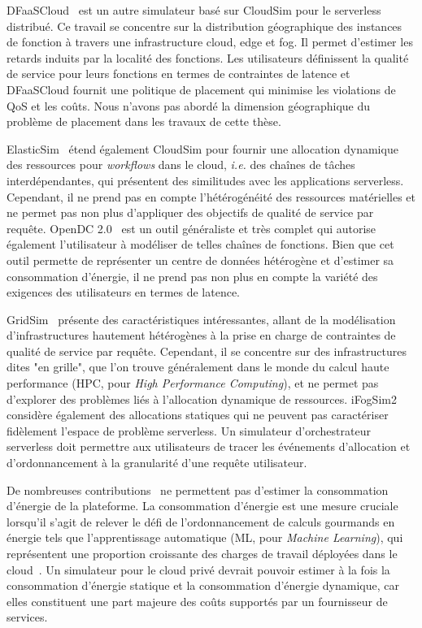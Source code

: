 DFaaSCloud~\cite{jeonCloudSimExtensionSimulatingDistributed2019} est un autre simulateur basé sur CloudSim pour le serverless distribué. Ce travail se concentre sur la distribution géographique des instances de fonction à travers une infrastructure cloud, edge et fog. Il permet d'estimer les retards induits par la localité des fonctions. Les utilisateurs définissent la qualité de service pour leurs fonctions en termes de contraintes de latence et DFaaSCloud fournit une politique de placement qui minimise les violations de \gls{QoS} et les coûts. Nous n'avons pas abordé la dimension géographique du problème de placement dans les travaux de cette thèse.

ElasticSim~\cite{cai_elasticsim_2017} étend également CloudSim pour fournir une allocation dynamique des ressources pour \textit{workflows} dans le cloud, \textit{i.e.} des chaînes de tâches interdépendantes, qui présentent des similitudes avec les applications serverless. Cependant, il ne prend pas en compte l'hétérogénéité des ressources matérielles et ne permet pas non plus d'appliquer des objectifs de qualité de service par requête. OpenDC 2.0~\cite{mastenbroekOpenDCConvenientModeling2021} est un outil généraliste et très complet qui autorise également l'utilisateur à modéliser de telles chaînes de fonctions. Bien que cet outil permette de représenter un centre de données hétérogène et d'estimer sa consommation d'énergie, il ne prend pas non plus en compte la variété des exigences des utilisateurs en termes de latence.

GridSim~\cite{buyyaGridSimToolkitModeling2002} présente des caractéristiques intéressantes, allant de la modélisation d'infrastructures hautement hétérogènes à la prise en charge de contraintes de qualité de service par requête. Cependant, il se concentre sur des infrastructures dites "en grille", que l'on trouve généralement dans le monde du calcul haute performance (\gls{HPC}, pour \textit{High Performance Computing}), et ne permet pas d'explorer des problèmes liés à l'allocation dynamique de ressources. iFogSim2~\cite{mahmudIFogSim2ExtendedIFogSim2021} considère également des allocations statiques qui ne peuvent pas caractériser fidèlement l'espace de problème serverless.
Un simulateur d'orchestrateur serverless doit permettre aux utilisateurs de tracer les événements d'allocation et d'ordonnancement à la granularité d'une requête utilisateur.

De nombreuses contributions~\cite{jeonCloudSimExtensionSimulatingDistributed2019, cai_elasticsim_2017, buyyaGridSimToolkitModeling2002, nunez_icancloud_2012} ne permettent pas d'estimer la consommation d'énergie de la plateforme. La consommation d'énergie est une mesure cruciale lorsqu'il s'agit de relever le défi de l'ordonnancement de calculs gourmands en énergie tels que l'apprentissage automatique (\gls{ML}, pour \textit{Machine Learning}), qui représentent une proportion croissante des charges de travail déployées dans le cloud~\cite{masanetRecalibratingGlobalData2020}.
Un simulateur pour le cloud privé devrait pouvoir estimer à la fois la consommation d'énergie statique et la consommation d'énergie dynamique, car elles constituent une part majeure des coûts supportés par un fournisseur de services.

